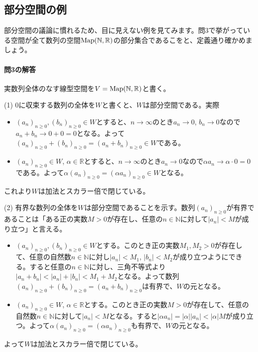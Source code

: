 \subsection{部分空間の例}

部分空間の議論に慣れるため、目に見えない例を見てみます。問$3$で挙がっている空間が全て数列の空間$\operatorname{Map}(\mathbb{N}, \mathbb{R})$の部分集合であるこをと、定義通り確かめましょう。

\paragraph{問3の解答} 実数列全体のなす線型空間を$V=\operatorname{Map}(\mathbb{N}, \mathbb{R})$と書く。

\noindent (1) $0$に収束する数列の全体を$W$と書くと、$W$は部分空間である。実際
\begin{itemize}
\item $(a_n)_{n \geq 0}, (b_n)_{n \geq 0}\in W$とすると、$n\rightarrow\infty$のとき$a_n\rightarrow 0$, $b_n\rightarrow 0$なので$a_n + b_n \rightarrow 0 + 0 = 0$となる。よって$(a_n)_{n \geq 0} + (b_n)_{n \geq 0} = (a_n + b_n)_{n \geq 0}\in W$である。
\item $(a_n)_{n \geq 0}\in W$, $\alpha\in\mathbb{R}$とすると、$n\rightarrow\infty$のとき$a_n \rightarrow 0$なので$\alpha a_n \rightarrow \alpha \cdot 0 = 0$である。よって$\alpha (a_n)_{n \geq 0} = (\alpha a_n)_{n \geq 0}\in W$となる。
\end{itemize}
これより$W$は加法とスカラー倍で閉じている。

\noindent (2) 有界な数列の全体を$W$は部分空間であることを示す。数列$(a_n)_{n \geq 0}$が有界であることは「ある正の実数$M>0$が存在し、任意の$n\in\mathbb{N}$に対して$|a_n| < M$が成り立つ」と言える。
\begin{itemize}
\item $(a_n)_{n \geq 0}, (b_n)_{n \geq 0}\in W$とする。このとき正の実数$M_1, M_2 > 0$が存在して、任意の自然数$n \in \mathbb{N}$に対し$|a_n| < M_1$, $|b_n| < M_2$が成り立つようにできる。すると任意の$n\in\mathbb{N}$に対し、三角不等式より$|a_n + b_n| < |a_n| + |b_n| < M_1 + M_2$となる。よって数列$(a_n)_{n \geq 0} + (b_n)_{n \geq 0} = (a_n + b_n)_{n \geq 0}$は有界で、$W$の元となる。
\item $(a_n)_{n \geq 0} \in W$, $\alpha\in\mathbb{R}$とする。このとき正の実数$M > 0$が存在して、任意の自然数$n\in\mathbb{N}$に対して$|a_n| < M$となる。すると$|\alpha a_n| = |\alpha| |a_n| < |\alpha|M$が成り立つ。よって$\alpha(a_n)_{n \geq 0} = (\alpha a_n)_{n \geq 0}$も有界で、$W$の元となる。
\end{itemize}
よって$W$は加法とスカラー倍で閉じている。

